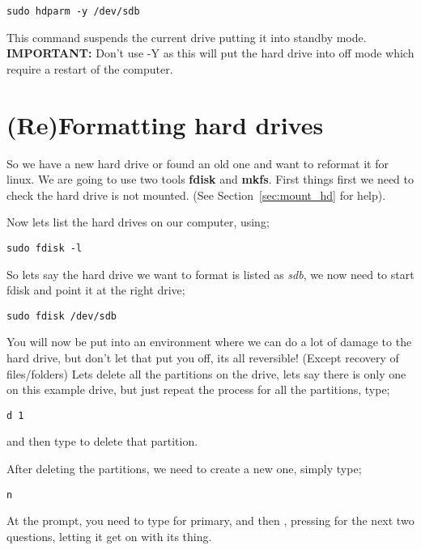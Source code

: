 \begin{lstlisting}
sudo hdparm -y /dev/sdb
\end{lstlisting}

This command suspends the current drive putting it into standby mode. \textbf{IMPORTANT:} Don't use -Y as this will put the hard drive into off mode which require a restart of the computer.


\section{(Re)Formatting hard drives}
\label{sec:format_hdd}

So we have a new hard drive or found an old one and want to reformat it for linux.  We are going to use two tools \textbf{fdisk} and \textbf{mkfs}.  First things first we need to check the hard drive is not mounted. (See Section~\ref{sec:mount_hd} for help).

Now lets list the hard drives on our computer, using;

\begin{lstlisting}
sudo fdisk -l
\end{lstlisting}

So lets say the hard drive we want to format is listed as \textit{sdb}, we now need to start fdisk and point it at the right drive;

\begin{lstlisting}
sudo fdisk /dev/sdb
\end{lstlisting}

You will now be put into an environment where we can do a lot of damage to the hard drive, but don't let that put you off, its all reversible! (Except recovery of files/folders)  Lets delete all the partitions on the drive, lets say there is only one on this example drive, but just repeat the process for all the partitions, type;

\begin{lstlisting}
d 1
\end{lstlisting}

and then type \keys{\enter} to delete that partition.

After deleting the partitions, we need to create a new one, simply type;

\begin{lstlisting}
n
\end{lstlisting}

At the prompt, you need to type  for primary, and then \keys{\enter}, pressing \keys{\enter} for the next two questions, letting it get on with its thing.

